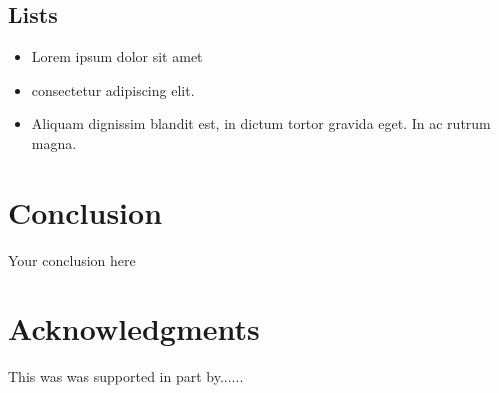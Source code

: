 \documentclass{article}
\begin{document}
\subsection{Lists}
\begin{itemize}
\item Lorem ipsum dolor sit amet
\item consectetur adipiscing elit. 
\item Aliquam dignissim blandit est, in dictum tortor gravida eget. In ac rutrum magna.
\end{itemize}


\section{Conclusion}
Your conclusion here

\section*{Acknowledgments}
This was was supported in part by......

  
  
\end{document}
